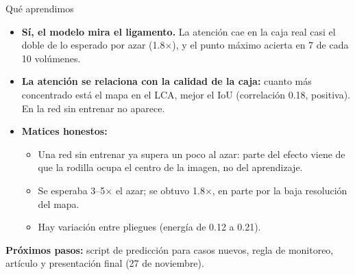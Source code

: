 \documentclass[aspectratio=169,11pt]{beamer}
\begin{document}
\begin{frame}{Qué aprendimos}
  \begin{itemize}
    \item \textbf{Sí, el modelo mira el ligamento.} La atención cae en la caja real casi el doble
          de lo esperado por azar (1.8$\times$), y el punto máximo acierta en 7 de cada 10 volúmenes.
    \item \textbf{La atención se relaciona con la calidad de la caja:} cuanto más concentrado está el mapa
          en el LCA, mejor el IoU (correlación 0.18, positiva). En la red sin entrenar no aparece.
    \item \textbf{Matices honestos:}
      \begin{itemize}
        \item Una red sin entrenar ya supera un poco al azar: parte del efecto viene de que la rodilla
              ocupa el centro de la imagen, no del aprendizaje.
        \item Se esperaba 3--5$\times$ el azar; se obtuvo 1.8$\times$, en parte por la baja resolución del mapa.
        \item Hay variación entre pliegues (energía de 0.12 a 0.21).
      \end{itemize}
  \end{itemize}
  \vspace{0.5em}
  \textbf{Próximos pasos:} script de predicción para casos nuevos, regla de monitoreo,
  artículo y presentación final (27 de noviembre).
\end{frame}
\end{document}
